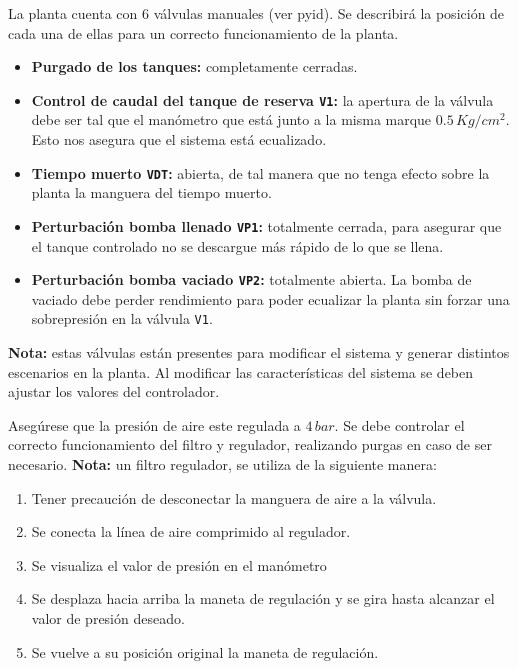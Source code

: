 \begin{tcolorbox}[title=Válvulas manuales, breakable]
La planta cuenta con 6 válvulas manuales (ver \gls{pyid}).
Se describirá la posición de cada una
de ellas para un correcto funcionamiento de la planta.
 
 \begin{itemize}
  \item \textbf{Purgado de los tanques:} completamente cerradas.
  \item \textbf{Control de caudal del tanque de reserva \texttt{V1}:}
  la apertura de la válvula debe ser tal que el manómetro que está junto
  a la misma marque $0.5\,{Kg}/{cm^2}$. Esto nos asegura que el sistema está
  ecualizado.
  \item \textbf{Tiempo muerto \texttt{VDT}:} abierta, de tal manera que no
tenga efecto sobre la  planta la manguera del tiempo muerto.
  \item \textbf{Perturbación bomba llenado \texttt{VP1}:} totalmente cerrada,
para asegurar que el tanque controlado no se descargue más rápido de lo que se
llena.
  \item \textbf{Perturbación bomba vaciado \texttt{VP2}:} totalmente abierta.
  La bomba de vaciado debe perder rendimiento para poder ecualizar la planta
sin forzar una sobrepresión en la válvula \texttt{V1}.
 \end{itemize}
 \tcblower
 \textbf{Nota:} estas válvulas están presentes para modificar el sistema y
generar distintos
escenarios en la planta. Al modificar las características del sistema se deben
ajustar los valores del controlador.
\end {tcolorbox}

\begin{tcolorbox}[title=Presión de aire]
  Asegúrese que la presión de aire este regulada a $4\,bar$. Se debe controlar
  el correcto funcionamiento del filtro y regulador, realizando purgas en caso
de ser necesario.
 \tcblower
  \textbf{Nota:} un filtro regulador, se utiliza de la siguiente manera:
 \begin{enumerate}
    \item Tener precaución de desconectar la manguera de aire a la válvula.
    \item Se conecta la línea de aire comprimido al regulador.
    \item Se visualiza el valor de presión en el manómetro
    \item Se desplaza hacia arriba la maneta de regulación y se gira hasta
      alcanzar el valor de presión deseado.
    \item Se vuelve a su posición original la maneta de regulación.
 \end{enumerate}
\end {tcolorbox}

